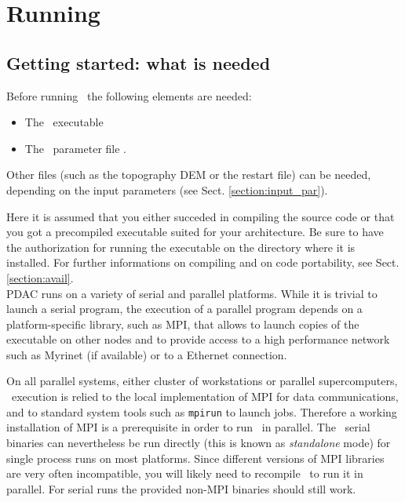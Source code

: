 \section{Running \PDAC}
\label{section:run}

\subsection{Getting started: what is needed}

Before running \PDAC\ the following elements are needed:
\begin{itemize}
\item The \PDAC\ executable 
\item The \PDAC\ parameter file .
\end{itemize}

Other files (such as the topography DEM or the restart file) can be needed,
depending on the input parameters (see Sect. \ref{section:input_par}).

Here it is assumed that you either succeded in compiling the source
code or that you got a precompiled executable suited for your architecture.
Be sure to have the authorization for running the executable on the
directory where it is installed. For further informations on compiling and 
on code portability, see Sect. \ref{section:avail}.\\

PDAC runs on a variety of serial and parallel platforms.  While it is
trivial to launch a serial program, the execution of a parallel program 
depends on a platform-specific library, such as MPI, that allows to launch 
copies of the executable on other nodes and to provide access to a high 
performance network such as Myrinet (if available) or to a Ethernet connection.

On all parallel systems, either cluster of workstations or parallel 
supercomputers, \PDAC\ execution is relied to the local implementation
of MPI for data communications, and to standard system tools such as
{\tt mpirun} to launch jobs. Therefore a working installation of MPI is a 
prerequisite in order to run \PDAC\ in parallel.
The \PDAC\ serial binaries can nevertheless be run directly (this is known 
as {\it standalone} mode) for single process runs on most platforms.
Since different versions of MPI libraries are very often incompatible, you will 
likely need to recompile \PDAC\ to run it in parallel. For serial runs
the provided non-MPI binaries should still work.

